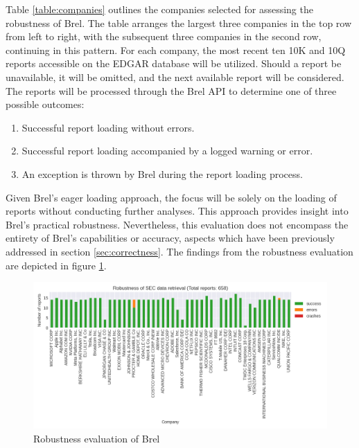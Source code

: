 
Table \ref{table:companies} outlines the companies selected for assessing the robustness of Brel.
The table arranges the largest three companies in the top row from left to right, with the subsequent three companies in the second row, continuing in this pattern.
For each company, the most recent ten 10K and 10Q reports accessible on the EDGAR database\cite{sec_edgar} will be utilized.
Should a report be unavailable, it will be omitted, and the next available report will be considered.
The reports will be processed through the Brel API to determine one of three possible outcomes:

\begin{enumerate}
\item Successful report loading without errors.
\item Successful report loading accompanied by a logged warning or error.
\item An exception is thrown by Brel during the report loading process.
\end{enumerate}

Given Brel's eager loading approach, the focus will be solely on the loading of reports without conducting further analyses.
This approach provides insight into Brel's practical robustness.
Nevertheless, this evaluation does not encompass the entirety of Brel's capabilities or accuracy, aspects which have been previously addressed in section \ref{sec:correctness}.
The findings from the robustness evaluation are depicted in figure \ref{fig:robustness}.

\begin{figure}[H]
    \centering
    \includegraphics[width=1\textwidth]{images/robustness.png}
    \caption{Robustness evaluation of Brel}
    \label{fig:robustness}
\end{figure}

